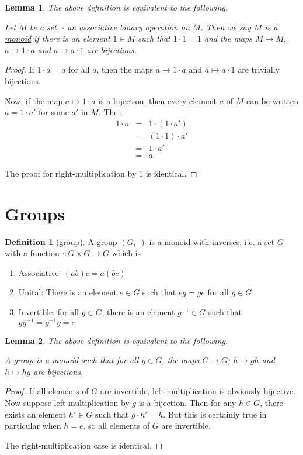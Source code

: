 \documentclass[a4paper,10pt]{scrreprt}
\newcommand{\defn}[1]{\ul{#1}}
\theoremstyle{definition}
\newtheorem{definition}{Definition}[section]
\theoremstyle{plain}
\newtheorem{lemma}{Lemma}[section]
\theoremstyle{remark}
\begin{document}
\begin{lemma}
  \label{lemma:monoidalmultiplicationbyunitbijective}
  The above definition is equivalent to the following.

  Let $M$ be a set, $\cdot$ an associative binary operation on $M$. Then we say $M$ is a \defn{monoid} if there is an element $1 \in M$ such that $1\cdot 1 = 1$ and the maps $M \to M$, $a \mapsto 1 \cdot a$ and $ a \mapsto a \cdot 1$ are bijections.
\end{lemma}
\begin{proof}
  If $1 \cdot a = a$ for all $a$, then the maps $a \to 1\cdot a$ and $a \mapsto a \cdot 1$ are trivially bijections.

  Now, if the map $a \mapsto 1 \cdot a$ is a bijection, then every element $a$ of $M$ can be written $a = 1 \cdot a'$ for some $a'$ in $M$. Then
  \begin{eqnarray*}
    1 \cdot a &=& 1 \cdot (1 \cdot a') \\
    &=& (1 \cdot 1) \cdot a' \\
    &=& 1 \cdot a' \\
    &=& a.
  \end{eqnarray*}

  The proof for right-multiplication by $1$ is identical.
\end{proof}

\section{Groups}
\begin{definition}[group]
  \label{def:group}
  A \defn{group} $(G, \cdot)$ is a monoid with inverses, i.e. a set $G$ with a function $\cdot\colon G \times G \to G$ which is
  \begin{enumerate}
    \item Associative: $(ab)c = a(bc)$
    \item Unital: There is an element $e \in G$ such that $eg = ge$ for all $g \in G$
    \item Invertible: for all $g \in G$, there is an element $g^{-1} \in G$ such that $gg^{-1} = g^{-1}g = e$
  \end{enumerate}
\end{definition}

\begin{lemma}
  The above definition is equivalent to the following. 

  A group is a monoid such that for all $g \in G$, the maps $G \to G$; $h \mapsto gh$ and $h \mapsto hg$ are bijections.
\end{lemma}
\begin{proof}
  If all elements of $G$ are invertible, left-multiplication is obviously bijective. Now suppose left-multiplication by $g$ is a bijection. Then for any $h \in G$, there exists an element $h' \in G$ such that $g \cdot h' = h$. But this is certainly true in particular when $h = e$, so all elements of $G$ are invertible.

  The right-multiplication case is identical.
\end{proof}
\end{document}
